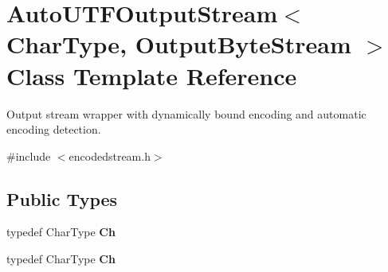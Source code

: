 \hypertarget{class_auto_u_t_f_output_stream}{}\section{Auto\+U\+T\+F\+Output\+Stream$<$ Char\+Type, Output\+Byte\+Stream $>$ Class Template Reference}
\label{class_auto_u_t_f_output_stream}


Output stream wrapper with dynamically bound encoding and automatic encoding detection.  




{\ttfamily \#include $<$encodedstream.\+h$>$}

\subsection*{Public Types}
\begin{DoxyCompactItemize}
\item 
typedef Char\+Type {\bfseries Ch}\hypertarget{class_auto_u_t_f_output_stream_abd8c486101026e11828e86c18991c9c0}{}\label{class_auto_u_t_f_output_stream_abd8c486101026e11828e86c18991c9c0}

\item 
typedef Char\+Type {\bfseries Ch}\hypertarget{class_auto_u_t_f_output_stream_abd8c486101026e11828e86c18991c9c0}{}\label{class_auto_u_t_f_output_stream_abd8c486101026e11828e86c18991c9c0}

\end{DoxyCompactItemize}
